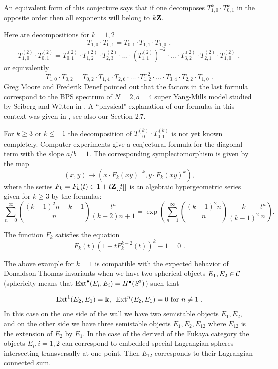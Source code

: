 \documentclass[12pt]{article}
\begin{document}
An equivalent form of this conjecture says that
 if one decomposes $T_{1,0}^k \cdot T_{0,1}^k$ in the opposite order then all exponents will belong to $k{\bf Z}$.

Here are decompositions for $k=1,2$ 
$$T_{1,0} \cdot T_{0,1} =T_{0,1}\cdot T_{1,1}\cdot T_{1,0}\,\,,$$
$$T_{1,0}^{(2)} \cdot T_{0,1}^{(2)}= T_{0,1}^{(2)}\cdot T_{1,2}^{(2)}\cdot T_{2,3}^{(2)}\cdot\dots
    \cdot (T_{1,1}^{(2)})^{-2} \cdot \dots\cdot T_{3,2}^{(2)} \cdot T_{2,1}^{(2)}
\cdot T_{1,0}^{(2)}\,\,,$$
or equivalently 
$$T_{1,0} \cdot T_{0,2}= T_{0,2}\cdot T_{1,4}\cdot T_{2,6}\cdot\dots
    \cdot T_{1,2}^{-2} \cdot \dots\cdot T_{3,4} \cdot T_{2,2}
\cdot T_{1,0}\,\,.$$
Greg Moore and Frederik Denef pointed out that the factors in the last formula correspond to the BPS spectrum of $N=2, d=4$ super Yang-Mills model studied by Seiberg and Witten in \cite{SeibW}. A ``physical" explanation of our formulas in this context was given in \cite{GaMNeit}, see also our Section 2.7.




For $k\geqslant 3$ or $k\le -1$ the  decomposition of $T_{1,0}^{(k)}\cdot T_{0,1}^{(k)}$ is  not yet known completely.
Computer experiments give a conjectural formula for the diagonal term with the slope $a/b=1$.
The corresponding symplectomorphism is given by the map
$$(x,y)\mapsto (x \cdot F_k(xy)^{-k}, y \cdot F_k(xy)^{k}),$$
where the series $F_k=F_k(t)\in 1+ t{\bf Z}[[t]]$ is an algebraic hypergeometric series given for $k\geqslant 3$ by the formulas:
$$\sum_{n=0}^\infty \binom {(k-1)^2n +k-1}{n}\frac {t^n}{(k-2)n+1}=
        \exp\left(\sum_{n=1}^\infty \binom{(k-1)^2n}{n}
\frac{k}{(k-1)^2}\frac{t^n}{n}\right).$$

The function $F_k$ satisfies the equation $$F_k(t)\left(1-t F^{k-2}_k(t)\right)^k-1=0\,\,.$$





\begin{rmk}
The above example for $k=1$ is compatible with the expected behavior of Donaldson-Thomas invariants when we have two spherical
objects $E_1,E_2\in {\mathcal C}$ (sphericity means that ${\operatorname{Ext}}^{\bullet}(E_i,E_i)=H^{\bullet}(S^3)$) such that

$${\operatorname{Ext}}^1 (E_2,E_1)={\bf k}, \,\,\, {\operatorname{Ext}}^n(E_2,E_1)=0 \text{ for } n\ne 1\,\,.$$
In this case on the one side of the wall we have two semistable objects $E_1,E_2$, and on the other side we have three
semistable objects $E_1,E_2, E_{12}$ where $E_{12}$ is the extension of $E_2$ by $E_1$. In the case of the derived of the Fukaya category  the objects $E_i, i=1,2$ can correspond to embedded special Lagrangian spheres intersecting transversally at one point. Then $E_{12}$ corresponds to their Lagrangian connected sum.

\end{rmk}
\end{document}
